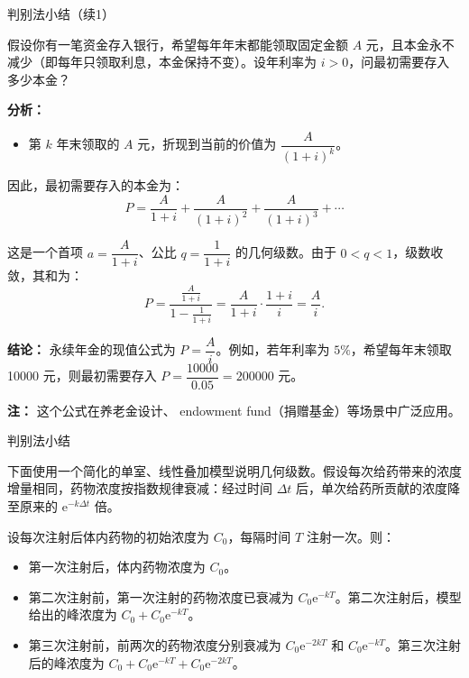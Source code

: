 \documentclass[aspectratio=169,10pt,fontset=fandol]{ctexbeamer}
\newcommand{\ee}{\mathrm{e}}
\begin{document}
\begin{frame}[t,fragile]{判别法小结（续1）}
\footnotesize
{\footnotesize
\begin{application}

假设你有一笔资金存入银行，希望每年年末都能领取固定金额 \(A\) 元，且本金永不减少（即每年只领取利息，本金保持不变）。设年利率为 \(i>0\)，问最初需要存入多少本金？

\textbf{分析：}
\begin{itemize}

\item 第 \(k\) 年末领取的 \(A\) 元，折现到当前的价值为 \(\dfrac{A}{(1+i)^k}\)。
\end{itemize}

因此，最初需要存入的本金为：
\[
P = \frac{A}{1+i} + \frac{A}{(1+i)^2} + \frac{A}{(1+i)^3} + \cdots
\]

这是一个首项 \(a=\dfrac{A}{1+i}\)、公比 \(q=\dfrac{1}{1+i}\) 的几何级数。由于 \(0<q<1\)，级数收敛，其和为：
\[
P=\frac{\frac{A}{1+i}}{1-\frac{1}{1+i}}
=\frac{A}{1+i}\cdot\frac{1+i}{i}
=\frac{A}{i}.
\]

\textbf{结论：} 永续年金的现值公式为 \(P=\dfrac{A}{i}\)。例如，若年利率为 \(5\%\)，希望每年末领取 10000 元，则最初需要存入 \(P=\dfrac{10000}{0.05}=200000\) 元。

\textbf{注：} 这个公式在养老金设计、 endowment fund（捐赠基金）等场景中广泛应用。
\end{application}
}
\end{frame}
\begin{frame}[t,fragile]{判别法小结}
\small
{\small
\begin{application}

下面使用一个简化的单室、线性叠加模型说明几何级数。假设每次给药带来的浓度增量相同，药物浓度按指数规律衰减：经过时间 \(\Delta t\) 后，单次给药所贡献的浓度降至原来的 \(\ee^{-k\Delta t}\) 倍。

设每次注射后体内药物的初始浓度为 \(C_0\)，每隔时间 \(T\) 注射一次。则：
\begin{itemize}
\item 第一次注射后，体内药物浓度为 \(C_0\)。
\item 第二次注射前，第一次注射的药物浓度已衰减为 \(C_0\ee^{-kT}\)。第二次注射后，模型给出的峰浓度为 \(C_0+C_0\ee^{-kT}\)。
\item 第三次注射前，前两次的药物浓度分别衰减为 \(C_0\ee^{-2kT}\) 和 \(C_0\ee^{-kT}\)。第三次注射后的峰浓度为 \(C_0+C_0\ee^{-kT}+C_0\ee^{-2kT}\)。

\end{itemize}\end{application}
}
\end{frame}
\end{document}
